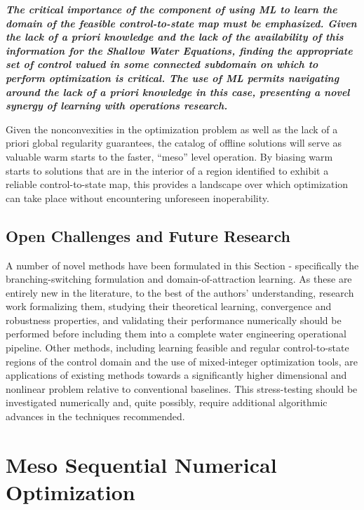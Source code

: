\documentclass{article}
\newcommand{\1}{\mathds{1}}          %
\theoremstyle{definition}
\begin{document}
\begin{sloppypar}
\textbf{\emph{The critical importance of the component of using ML to learn the domain of the feasible control-to-state map must be emphasized. Given the lack of a priori knowledge and the lack of the availability of this information for the Shallow Water Equations, finding the appropriate set of control valued in some connected subdomain on which to perform optimization is critical. The use of ML permits navigating around the lack of a priori knowledge in this case, presenting a novel synergy of learning with operations research. }}

Given the nonconvexities in the optimization problem as well as the lack of a priori global regularity guarantees, the catalog of offline solutions will serve as valuable warm starts to the faster, ``meso'' level operation. By biasing warm starts to solutions that are in the interior of a region identified to exhibit a reliable control-to-state map, this provides a landscape over which optimization can take place without encountering unforeseen inoperability. 


\subsection{Open Challenges and Future Research}

A number of novel methods have been formulated in this Section - specifically the branching-switching formulation and domain-of-attraction learning. As these are entirely new in the literature, to the best of the authors' understanding, research work formalizing them, studying their theoretical learning, convergence and robustness properties, and validating their performance numerically should be performed before including them into a complete water engineering operational pipeline. Other methods, including learning feasible and regular control-to-state regions of the control domain and the use of mixed-integer optimization tools, are applications of existing methods towards a significantly higher dimensional and nonlinear problem relative to conventional baselines. This stress-testing should be investigated numerically and, quite possibly, require additional algorithmic advances in the techniques recommended. 

\section{Meso Sequential Numerical Optimization}


\end{sloppypar}
\end{document}
